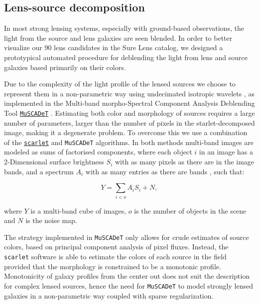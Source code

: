 \documentclass[tradiabstract,twocolumn]{aa}
\begin{document}
\subsection{Lens-source decomposition}\label{subsec:decomp}

In most strong lensing systems, especially with ground-based observations, the light from the source and lens galaxies are seen blended. In order to better visualize our 90 lens candidates in the Sure Lens catalog, we designed a prototypical automated procedure for deblending the light from lens and source galaxies based primarily on their colors. 

Due to the complexity of the light profile of the lensed sources we choose to represent them in a non-parametric way using undecimated isotropic wavelets \citep[starlets,][]{Starck2007}, as implemented in the Multi-band morpho-Spectral Component Analysis Deblending Tool \href{https://github.com/herjy/MuSCADeT}{\faGithub \tt MuSCADeT} \citep{Joseph2016}. Estimating both color and morphology of sources requires a large number of parameters, larger than the number of pixels in the starlet-decomposed image, making it a degenerate problem. To overcome this we use a combination of the \href{https://github.com/pmelchior/scarlet}{\faGithub \tt scarlet} \citep{Melchior2018} and {\tt MuSCADeT} algorithms. In both methods multi-band images are modeled as sums of factorised components, where each object $i$ in an image has a 2-Dimensional surface brightness $S_i$ with as many pixels as there are in the image bands, and a spectrum $A_i$ with as many entries as there are bands \citep[see details in][]{Melchior2018, Joseph2016}, such that:

\begin{equation}
    Y = \sum_{i<o}A_i S_i + N,
\end{equation}

\noindent where $Y$ is a multi-band cube of images, $o$ is the number of objects in the scene and $N$ is the noise map.

The strategy implemented in {\tt MuSCADeT} only allows for crude estimates of source colors, based on principal component analysis of pixel fluxes. Instead, the {\tt scarlet} software is able to estimate the colors of each source in the field provided that the morphology is constrained to be a monotonic profile. Monotonicity of galaxy profiles from the center out does not suit the description for complex lensed sources, hence the need for {\tt MuSCADeT} to model strongly lensed galaxies in a non-parametric way coupled with sparse regularization.
\end{document}
